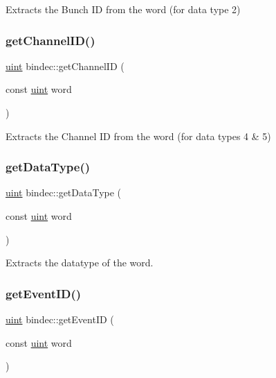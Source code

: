Extracts the Bunch ID from the word (for data type 2) 

\mbox{\label{namespacebindec_af1997af0743251d010780a8f728fcd7e}} 
\subsubsection{\texorpdfstring{get\+Channel\+I\+D()}{getChannelID()}}
{\footnotesize\ttfamily \hyperlink{namespacebindec_a61700e6ffcfc677215bfdf223803e735}{uint} bindec\+::get\+Channel\+ID (\begin{DoxyParamCaption}\item[{const \hyperlink{namespacebindec_a61700e6ffcfc677215bfdf223803e735}{uint}}]{word }\end{DoxyParamCaption})\hspace{0.3cm}{\ttfamily [inline]}}



Extracts the Channel ID from the word (for data types 4 \& 5) 

\mbox{\label{namespacebindec_a7a98adfd04c65f870f74a423bfd744fe}} 
\subsubsection{\texorpdfstring{get\+Data\+Type()}{getDataType()}}
{\footnotesize\ttfamily \hyperlink{namespacebindec_a61700e6ffcfc677215bfdf223803e735}{uint} bindec\+::get\+Data\+Type (\begin{DoxyParamCaption}\item[{const \hyperlink{namespacebindec_a61700e6ffcfc677215bfdf223803e735}{uint}}]{word }\end{DoxyParamCaption})\hspace{0.3cm}{\ttfamily [inline]}}



Extracts the datatype of the word. 

\mbox{\label{namespacebindec_a7164db2f87d4d2cfa12b2cd147d2402d}} 
\subsubsection{\texorpdfstring{get\+Event\+I\+D()}{getEventID()}}
{\footnotesize\ttfamily \hyperlink{namespacebindec_a61700e6ffcfc677215bfdf223803e735}{uint} bindec\+::get\+Event\+ID (\begin{DoxyParamCaption}\item[{const \hyperlink{namespacebindec_a61700e6ffcfc677215bfdf223803e735}{uint}}]{word }\end{DoxyParamCaption})\hspace{0.3cm}{\ttfamily [inline]}}



